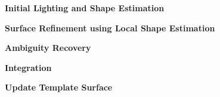 \documentclass[10pt]{article}
\begin{document}
\noindent \textbf{Initial Lighting and Shape Estimation \\}




\noindent \textbf{Surface Refinement using Local Shape Estimation \\}

\noindent \textbf{Ambiguity Recovery \\}

\noindent \textbf{Integration \\}

\noindent \textbf{Update Template Surface \\}



{}

\end{document}
